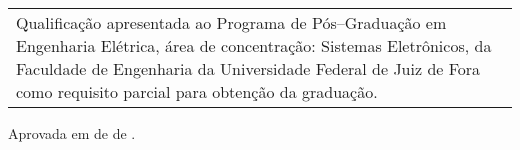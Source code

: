 \thispagestyle{empty}

\begin{center}

\Autor

\vfill

\TITULO

\vfill

\end{center}

\begin{flushright}
    \begin{tabular}{p{8.0cm}}
    Qualifica\c{c}\~{a}o apresentada ao Programa de P\'{o}s--Gradua\c{c}\~{a}o em Engenharia El\'{e}trica, \'{a}rea de concentra\c{c}\~{a}o: Sistemas Eletr\^{o}nicos, da Faculdade de Engenharia da Universidade Federal de Juiz de Fora como requisito parcial para obten\c{c}\~{a}o da graduação.
    \end{tabular}
\end{flushright}

\vspace{1.0cm}

\noindent Aprovada em \Dia de \Mes de \Ano.\\

